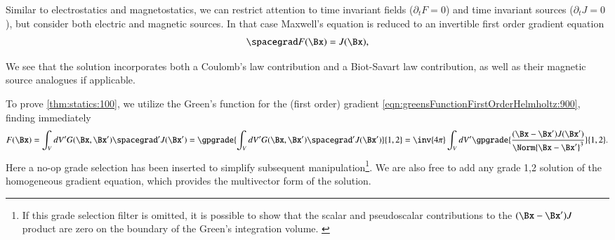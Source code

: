 %
%
Similar to electrostatics and magnetostatics, we can restrict attention to time invariant fields (\( \partial_t F = 0\)) and time invariant sources (\(\partial_t J = 0\)), but consider both electric and magnetic sources.  In that case Maxwell's equation is reduced to an invertible first order gradient equation
\begin{dmath}\label{eqn:statics:20}
\spacegrad F(\Bx) = J(\Bx),
\end{dmath}


We see that the solution incorporates both a {\color{DarkOliveGreen}Coulomb's law} contribution and a {\color{Maroon}Biot-Savart law} contribution, as well as their magnetic source analogues if applicable.

To prove \cref{thm:statics:100},
we utilize the Green's function for the (first order) gradient
\cref{eqn:greensFunctionFirstOrderHelmholtz:900},
finding immediately
\begin{dmath}\label{eqn:statics:40}
F(\Bx)
= \int_V dV' G(\Bx, \Bx') \spacegrad' J(\Bx')
= \gpgrade{\int_V dV' G(\Bx, \Bx') \spacegrad' J(\Bx')}{1,2}
= \inv{4\pi} \int_V dV' \gpgrade{\frac{(\Bx - \Bx') J(\Bx')}{\Norm{\Bx - \Bx'}^3} }{1,2}.
\end{dmath}
Here a no-op grade selection has been inserted to simplify subsequent manipulation\footnote{If this grade selection filter is omitted, it is possible to show that the scalar and pseudoscalar contributions to the \( (\Bx -\Bx') J \) product are zero on the boundary of the Green's integration volume. \citep{jancewicz1988multivectors:appendixI}}.
We are also free to add any grade 1,2 solution of the homogeneous gradient equation, which provides the multivector form of the solution.

